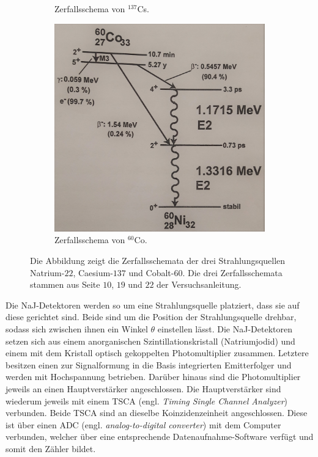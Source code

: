 \begin{figure}[H]
\begin{subfigure}[t]{0.5\textwidth}
		\caption{Zerfallsschema von $^{137}$Cs.}
	\end{subfigure}
	\begin{subfigure}[t]{0.5\textwidth}
		\centering
		\includegraphics[width=\textwidth]{img/ZerfallsschemaVonCo60}
		\caption{Zerfallsschema von $^{60}$Co.}
	\end{subfigure}
	\caption{Die Abbildung zeigt die Zerfallsschemata der drei Strahlungsquellen Natrium-$22$, Caesium-$137$ und Cobalt-$60$. Die drei Zerfallsschemata stammen aus Seite $10$, $19$ und $22$ der Versuchsanleitung\cite{wwu}.}
	\label{Zerfallsschemata}
\end{figure}
\noindent Die NaJ-Detektoren werden so um eine Strahlungsquelle platziert, dass sie auf diese gerichtet sind.
Beide sind um die Position der Strahlungsquelle drehbar, sodass sich zwischen ihnen ein Winkel $\theta$ einstellen lässt.
Die NaJ-Detektoren setzen sich aus einem anorganischen Szintillationskristall (Natriumjodid) und einem mit dem Kristall optisch gekoppelten Photomultiplier zusammen.
Letztere besitzen einen zur Signalformung in die Basis integrierten Emitterfolger und werden mit Hochspannung betrieben.
Darüber hinaus sind die Photomultiplier jeweils an einen Hauptverstärker angeschlossen.
Die Hauptverstärker sind wiederum jeweils mit einem TSCA (engl. \emph{Timing Single Channel Analyzer}) verbunden.
Beide TSCA sind an dieselbe Koinzidenzeinheit angeschlossen.
Diese ist über einen ADC (engl. \emph{analog-to-digital converter}) mit dem Computer verbunden, welcher über eine entsprechende Datenaufnahme-Software verfügt und somit den Zähler bildet.

